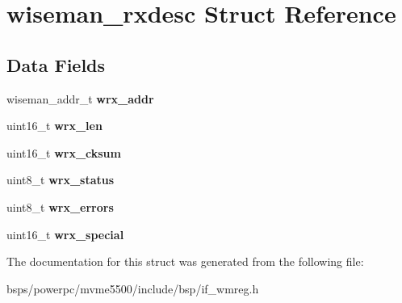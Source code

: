 \hypertarget{structwiseman__rxdesc}{}\section{wiseman\+\_\+rxdesc Struct Reference}
\label{structwiseman__rxdesc}
\subsection*{Data Fields}
\begin{DoxyCompactItemize}
\item 
\mbox{\label{structwiseman__rxdesc_a23d62cd0018a2a2ea615f543987f029e}} 
wiseman\+\_\+addr\+\_\+t {\bfseries wrx\+\_\+addr}
\item 
\mbox{\label{structwiseman__rxdesc_ac7c32bd7a85b96c92c813f878301450c}} 
uint16\+\_\+t {\bfseries wrx\+\_\+len}
\item 
\mbox{\label{structwiseman__rxdesc_a402c78f1e19e7c9d3f6d61c243326eab}} 
uint16\+\_\+t {\bfseries wrx\+\_\+cksum}
\item 
\mbox{\label{structwiseman__rxdesc_a65e9c78f33dec41688a1d8ddb60295fa}} 
uint8\+\_\+t {\bfseries wrx\+\_\+status}
\item 
\mbox{\label{structwiseman__rxdesc_aec38832a56652644fd28994ee2959945}} 
uint8\+\_\+t {\bfseries wrx\+\_\+errors}
\item 
\mbox{\label{structwiseman__rxdesc_a02dfd6ff6a50055f3496a5695ce903b9}} 
uint16\+\_\+t {\bfseries wrx\+\_\+special}
\end{DoxyCompactItemize}


The documentation for this struct was generated from the following file\+:\begin{DoxyCompactItemize}
\item 
bsps/powerpc/mvme5500/include/bsp/if\+\_\+wmreg.\+h\end{DoxyCompactItemize}

